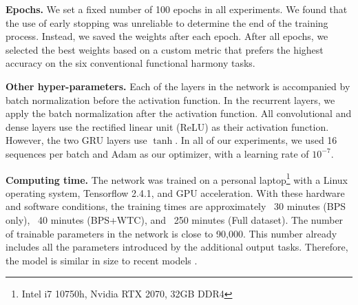 
\textbf{Epochs.}
We set a fixed number of 100 epochs in all experiments.
We found that the use of early stopping was unreliable to determine the end of the training process.
Instead, we saved the weights after each epoch.
After all epochs, we selected the best weights based on a custom metric that prefers the highest accuracy on the six conventional functional harmony tasks.

\textbf{Other hyper-parameters.}
Each of the layers in the network is accompanied by batch normalization before the activation function. In the recurrent layers, we apply the batch normalization after the activation function. All convolutional and dense layers use the rectified linear unit (ReLU) as their activation function. However, the two GRU layers use $\tanh$. In all of our experiments, we used 16 sequences per batch and Adam \cite{kingma2014adam} as our optimizer, with a learning rate of $10^{-7}$.



\textbf{Computing time.} The network was trained on a personal laptop\footnote{Intel i7 10750h, Nvidia RTX 2070, 32GB DDR4} with a Linux operating system, Tensorflow 2.4.1, and GPU acceleration.
With these hardware and software conditions, the training times are approximately ~30 minutes (BPS only), ~40 minutes (BPS+WTC), and ~250 minutes (Full dataset).
The number of trainable parameters in the network is close to 90,000. This number already includes all the parameters introduced by the additional output tasks. Therefore, the model is similar in size to recent models \cite{micchi2020not, chen2021attend}.
